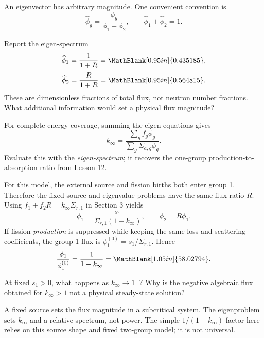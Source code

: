 \begin{handoutcolumns}
\switchcolumn
\RaggedRight
{}
An eigenvector has arbitrary magnitude. One convenient convention is
\[
 \widehat\phi_g=\frac{\phi_g}{\phi_1+\phi_2},
 \qquad \widehat\phi_1+\widehat\phi_2=1.
\]
\begin{boardbox}{Report the eigen-spectrum}
\[
 \widehat\phi_1=\frac{1}{1+R}
   =\MathBlank[0.95in]{0.435185},
\]
\[
 \widehat\phi_2=\frac{R}{1+R}
   =\MathBlank[0.95in]{0.564815}.
\]
These are dimensionless fractions of total flux, not neutron
number fractions. What additional information would set a
physical flux magnitude?
\end{boardbox}
For complete energy coverage, summing the eigen-equations gives
\[
 \boxed{k_{\infty}=
 \frac{\sum_g f_g\phi_g}{\sum_g\Sigma_{a,g}\phi_g}}.
\]
Evaluate this with the \emph{eigen-spectrum}; it recovers the
one-group production-to-absorption ratio from Lesson 12.

For this model, the external source and fission births both enter
group 1. Therefore the fixed-source and eigenvalue problems have
the same flux ratio $R$.
Using $f_1+f_2R=k_{\infty}\Sigma_{r,1}$ in Section 3 yields
\[
 \boxed{\phi_1=\frac{s_1}{\Sigma_{r,1}(1-k_{\infty})}},
 \qquad \phi_2=R\phi_1.
\]
If fission \emph{production} is suppressed while keeping the
same loss and scattering coefficients, the group-1 flux is
$\phi_1^{(0)}=s_1/\Sigma_{r,1}$. Hence
\[
 \frac{\phi_1}{\phi_1^{(0)}}=\frac1{1-k_{\infty}}
 =\MathBlank[1.05in]{58.02794}.
\]
\begin{checkpoint}
At fixed $s_1>0$, what happens as $k_{\infty}\to1^{-}$?
Why is the negative algebraic flux obtained for $k_{\infty}>1$
not a physical steady-state solution?
\end{checkpoint}
\begin{takeawaybox}
A fixed source sets the flux magnitude in a subcritical system.
The eigenproblem sets $k_{\infty}$ and a relative spectrum, not
power. The simple $1/(1-k_{\infty})$ factor here relies on this
source shape and fixed two-group model; it is not universal.
\end{takeawaybox}
\end{handoutcolumns}


